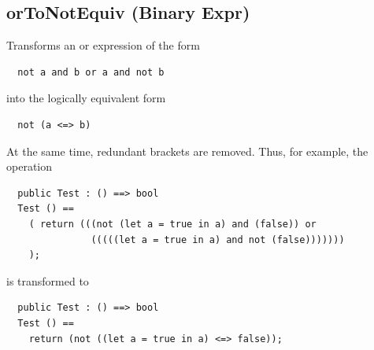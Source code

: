 \documentclass[\pformat,12pt]{article}
\begin{document}




\subsection{orToNotEquiv (Binary Expr)}
  Transforms an or expression of the form
\begin{verbatim}
  not a and b or a and not b
\end{verbatim}
into the logically equivalent form
\begin{verbatim}
  not (a <=> b)
\end{verbatim}
At the same time, redundant brackets are removed. Thus, for example,
the operation
\begin{verbatim}
  public Test : () ==> bool
  Test () ==
    ( return (((not (let a = true in a) and (false)) or 
               (((((let a = true in a) and not (false)))))))
    );
\end{verbatim}
is transformed to
\begin{verbatim}
  public Test : () ==> bool
  Test () ==
    return (not ((let a = true in a) <=> false));
\end{verbatim}
\end{document}
